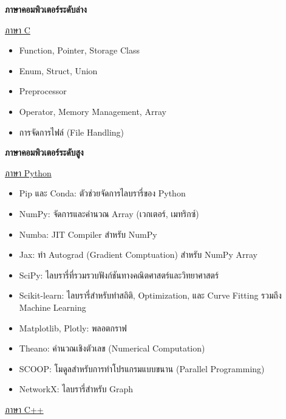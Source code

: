 \noindent \textbf{ภาษาคอมพิวเตอร์ระดับล่าง}

\noindent \underline{ภาษา C}

\begin{itemize}[topsep=0pt]
  \item Function, Pointer, Storage Class

  \item Enum, Struct, Union

  \item Preprocessor

  \item Operator, Memory Management, Array

  \item การจัดการไฟล์ (File Handling)
\end{itemize}

\noindent \textbf{ภาษาคอมพิวเตอร์ระดับสูง}

\noindent \underline{ภาษา Python}

\begin{itemize}[topsep=0pt]
  \item Pip และ Conda: ตัวช่วยจัดการไลบรารี่ของ Python

  \item NumPy: จัดการและคำนวณ Array (เวกเตอร์, เมทริกซ์)

  \item Numba: JIT Compiler สำหรับ NumPy

  \item Jax: ทำ Autograd (Gradient Comptuation) สำหรับ NumPy Array

  \item SciPy: ไลบรารี่ที่รวมรวบฟังก์ชันทางคณิตศาสตร์และวิทยาศาสตร์

  \item Scikit-learn: ไลบรารี่สำหรับทำสถิติ, Optimization, และ Curve Fitting รวมถึง Machine Learning

  \item Matplotlib, Plotly: พลอตกราฟ

  \item Theano: คำนวณเชิงตัวเลข (Numerical Computation)

  \item SCOOP: โมดูลสำหรับการทำโปรแกรมแบบขนาน (Parallel Programming)

  \item NetworkX: ไลบรารี่สำหรับ Graph
\end{itemize}

\noindent \underline{ภาษา C++}

